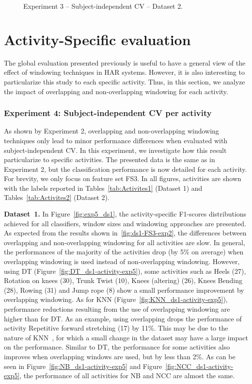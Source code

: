 \begin{figure}[htp]
   \caption{Experiment 3 -- Subject-independent CV -- Dataset 2.}
    \label{fig:exp3_ds2}
    
\end{figure}

\section{Activity-Specific evaluation}\label{per_activity_evaluation}
The global evaluation presented previously is useful to have a general view of the effect of windowing techniques in HAR systems. However, it is also interesting to particularize this study to each specific activity. Thus, in this section, we analyze the impact of overlapping and non-overlapping windowing for each activity.

\subsubsection{Experiment 4: Subject-independent CV per activity}
As shown by Experiment 2, overlapping and non-overlapping windowing techniques only lead to minor performance differences when evaluated with subject-independent CV. In this experiment, we investigate how this result particularize to specific activities. The presented data is the same as in Experiment 2, but the classification performance is now detailed for each activity.
For brevity, we only focus on feature set FS3. In all figures, activities are shown with the labels reported in Tables~\ref{tab:Activites1} (Dataset 1) and Tables~\ref{tab:Activites2} (Dataset 2).  

\noindent\textbf{Dataset~1.} In Figure~\ref{fig:exp5_ds1}, the activity-specific F1-scores distributions achieved for all classifiers, window sizes and windowing approaches are presented. As expected from the results shown in~\ref{fig:ds1-FS3-exp2}, the differences between overlapping and non-overlapping windowing for all activities are slow. In general, the performances of the majority of the activities drop (by 5\% on average) when overlapping windowing is used instead of non-overlapping windowing. However, using DT (Figure~\ref{fig:DT_ds1-activity-exp5}), some activities such as Heels  (27), Rotation on knees (30), Trunk Twist (10), Knees (altering) (26), Knees Bending (28), Rowing (31) and Jump rope (8) show a small performance improvement by overlapping windowing.  As for KNN (Figure~\ref{fig:KNN_ds1-activity-exp5}), performance reductions resulting from the use of overlapping windowing are higher than for DT. As an example, using overlapping drops the performance of activity Repetitive forward stretching (17) by 11\%. This may be due to the nature of KNN~\cite{cover1967nearest}, for which a small change in the dataset may have a large impact on the performance. Similar to DT, the performance for some activities also improves when overlapping windows are used, but by less than 2\%. As can be seen in Figure~\ref{fig:NB_ds1-activity-exp5} and Figure~\ref{fig:NCC_ds1-activity-exp5}, the performance of all activities for NB and NCC are almost the same.    



